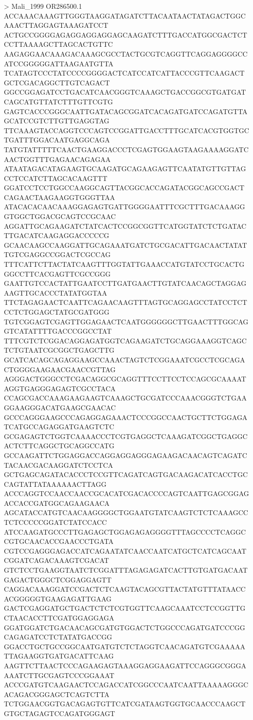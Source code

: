 > Mali_1999 OR286500.1
ACCAAACAAAGTTGGGTAAGGATAGATCTTACAATAACTATAGACTGGCAAACTTAGGAGTAAAGATCCT
ACTGCCGGGGAGAGGAGGAGGAGCAAGATCTTTGACCATGGCGACTCTCCTTAAAAGCTTAGCACTGTTC
AAGAGGAACAAAGACAAAGCGCCTACTGCGTCAGGTTCAGGAGGGGCCATCCGGGGGATTAAGAATGTTA
TCATAGTCCCTATCCCCGGGGACTCATCCATCATTACCCGTTCAAGACTGCTCGACAGGCTTGTCAGACT
GGCCGGAGATCCTGACATCAACGGGTCAAAGCTGACCGGCGTGATGATCAGCATGTTATCTTTGTTCGTG
GAGTCACCCGGGCAATTGATACAGCGGATCACAGATGATCCAGATGTTAGCATCCGTCTTGTTGAGGTAG
TTCAAAGTACCAGGTCCCAGTCCGGATTGACCTTTGCATCACGTGGTGCTGATTTGGACAATGAGGCAGA
TATGTATTTTTCAACTGAAGGACCCTCGAGTGGAAGTAAGAAAAGGATCAACTGGTTTGAGAACAGAGAA
ATAATAGACATAGAAGTGCAAGATGCAGAAGAGTTCAATATGTTGTTAGCCTCCATCTTAGCACAAGTTT
GGATCCTCCTGGCCAAGGCAGTTACGGCACCAGATACGGCAGCCGACTCAGAACTAAGAAGGTGGGTTAA
ATACACACAACAAAGGAGAGTGATTGGGGAATTTCGCTTTGACAAAGGGTGGCTGGACGCAGTCCGCAAC
AGGATTGCAGAAGATCTATCACTCCGGCGGTTCATGGTATCTCTGATACTTGACATCAAGAGGACCCCCG
GCAACAAGCCAAGGATTGCAGAAATGATCTGCGACATTGACAACTATATTGTCGAGGCCGGACTCGCCAG
TTTCATTCTTACTATCAAGTTTGGTATTGAAACCATGTATCCTGCACTGGGCCTTCACGAGTTCGCCGGG
GAATTGTCCACTATTGAATCCTTGATGAACTTGTATCAACAGCTAGGAGAAGTTGCACCCTATATGGTAA
TTCTAGAGAACTCAATTCAGAACAAGTTTAGTGCAGGAGCCTATCCTCTCCTCTGGAGCTATGCGATGGG
TGTCGGAGTCGAGTTGGAGAACTCAATGGGGGGCTTGAACTTTGGCAGGTCATATTTTGACCCGGCCTAT
TTTCGTCTCGGACAGGAGATGGTCAGAAGATCTGCAGGAAAGGTCAGCTCTGTAATCGCGGCTGAGCTTG
GCATCACAGCAGAGGAAGCCAAACTAGTCTCGGAAATCGCCTCGCAGACTGGGGAAGAACGAACCGTTAG
AGGGACTGGGCCTCGACAGGCGCAGGTTTCCTTCCTCCAGCGCAAAATAGGTGAGGGAGAGTCGCCTACA
CCAGCGACCAAAGAAGAAGTCAAAGCTGCGATCCCAAACGGGTCTGAAGGAAGGGACATGAAGCGAACAC
GCCCAGGGAAGCCCAGAGGAGAAACTCCCGGCCAACTGCTTCTGGAGATCATGCCAGAGGATGAAGTCTC
GCGAGAGTCTGGTCAAAACCCTCGTGAGGCTCAAAGATCGGCTGAGGCACTCTTCAGGCTGCAGGCCATG
GCCAAGATTCTGGAGGACCAGGAGGAGGGAGAAGACAACAGTCAGATCTACAACGACAAGGATCTCCTCA
GCTGAGCAGATACACCCTCCGTTCAGATCAGTGACAAGACATCACCTGCCAGTATTATAAAAAACTTAGG
ACCCAGGTCCAACCAACCGCACATCGACACCCCAGTCAATTGAGCGGAGACCACCGATGGCAGAAGAACA
AGCATACCATGTCAACAAGGGGCTGGAATGTATCAAGTCTCTCAAAGCCTCTCCCCCGGATCTATCCACC
ATCCAAGATGCCCTTGAGAGCTGGAGAGAGGGGTTTAGCCCCTCAGGCCGTGCAACACCGAACCCTGATA
CGTCCGAGGGAGACCATCAGAATATCAACCAATCATGCTCATCAGCAATCGGATCAGACAAAGTCGACAT
GTCTCCTGAAGGTAATCTCGGATTTAGAGAGATCACTTGTGATGACAATGAGACTGGGCTCGGAGGAGTT
CAGGACAAAGGATCCGACTCTCAAGTACAGCGTTACTATGTTTATAACCACGGGGGTGAAGAGATTGAAG
GACTCGAGGATGCTGACTCTCTCGTGGTTCAAGCAAATCCTCCGGTTGCTAACACCTTCGATGGAGGAGA
GGATGGATCTGACAACAGCGATGTGGACTCTGGCCCAGATGATCCCGGCAGAGATCCTCTATATGACCGG
GGACCTGCTGCCGGCAATGATGTCTCTAGGTCAACAGATGTCGAAAAATTAGAAGGTGATGACATTCAAG
AAGTTCTTAACTCCCAGAAGAGTAAAGGAGGAAGATTCCAGGGCGGGAAAATCTTGCGAGTCCCGGAAAT
ACCCGATGTCAAGAACTCCAGACCATCGGCCCAATCAATTAAAAAGGGCACAGACGGGAGCTCAGTCTTA
TCTGGAACGGTGACAGAGTGTTCATCGATAAGTGGTGCAACCCAAGCTGTGCTAGAGTCCAGATGGGAGT
